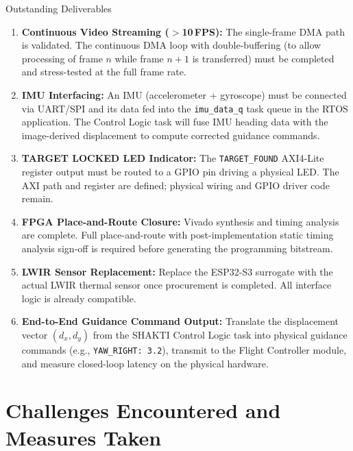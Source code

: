 \documentclass[12pt,a4paper]{article}
\begin{document}
\begin{reportbox}{Outstanding Deliverables}
\begin{enumerate}[leftmargin=*, itemsep=8pt]

\item \textbf{Continuous Video Streaming ($>$10\,FPS):}
The single-frame DMA path is validated. The continuous DMA loop with double-buffering (to allow processing of frame $n$ while frame $n+1$ is transferred) must be completed and stress-tested at the full frame rate.

\item \textbf{IMU Interfacing:}
An IMU (accelerometer + gyroscope) must be connected via UART/SPI and its data fed into the \texttt{imu\_data\_q} task queue in the RTOS application. The Control Logic task will fuse IMU heading data with the image-derived displacement to compute corrected guidance commands.

\item \textbf{TARGET LOCKED LED Indicator:}
The \texttt{TARGET\_FOUND} AXI4-Lite register output must be routed to a GPIO pin driving a physical LED. The AXI path and register are defined; physical wiring and GPIO driver code remain.

\item \textbf{FPGA Place-and-Route Closure:}
Vivado synthesis and timing analysis are complete. Full place-and-route with post-implementation static timing analysis sign-off is required before generating the programming bitstream.

\item \textbf{LWIR Sensor Replacement:}
Replace the ESP32-S3 surrogate with the actual LWIR thermal sensor once procurement is completed. All interface logic is already compatible.

\item \textbf{End-to-End Guidance Command Output:}
Translate the displacement vector $(d_x, d_y)$ from the SHAKTI Control Logic task into physical guidance commands (e.g., \texttt{YAW\_RIGHT: 3.2\textdegree{}}), transmit to the Flight Controller module, and measure closed-loop latency on the physical hardware.

\end{enumerate}
\end{reportbox}

\section{Challenges Encountered and Measures Taken}
\end{document}
